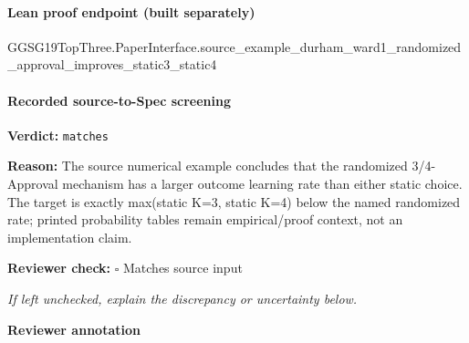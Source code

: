 \documentclass[10pt]{article}
\newcommand{\reviewerbox}{%
  \par\noindent\fbox{\parbox{0.96\linewidth}{\rule{0pt}{0.38in}}}\par
}
\newcommand{\reviewmatch}[1]{%
  \par\noindent\textbf{Reviewer check:} $\square$\; #1\par
  \noindent\emph{If left unchecked, explain the discrepancy or uncertainty below.}\par
}
\begin{document}
\paragraph{Lean proof endpoint (built separately)}\begin{ReviewVerbatim}
GGSG19TopThree.PaperInterface.source_example_durham_ward1_randomized_approval_improves_static3_static4
\end{ReviewVerbatim}

\paragraph{Recorded source-to-Spec screening}
\textbf{Verdict:} \texttt{matches}
\\
{\raggedright
\textbf{Reason:} The source numerical example concludes that the randomized 3/\allowbreak{}4-\allowbreak{}Approval mechanism has a larger outcome learning rate than either static choice.\allowbreak{} The target is exactly max(static K=3, static K=4) below the named randomized rate;\allowbreak{} printed probability tables remain empirical/\allowbreak{}proof context, not an implementation claim.\allowbreak{}
\par}
\reviewmatch{Matches source input}
\noindent\textbf{Reviewer annotation}\par
\reviewerbox
\end{document}
